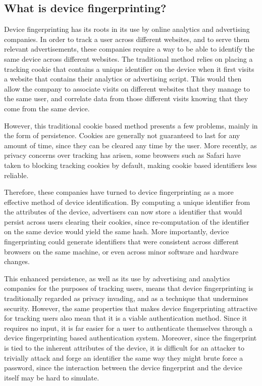 \documentclass{acm_proc_article-sp}
\begin{document}
\subsection{What is device fingerprinting?}
Device fingerprinting has its roots in its use by online analytics and advertising companies. In order to track a user across different websites, and to serve them relevant advertisements, these companies require a way to be able to identify the same device across different websites. The traditional method relies on placing a tracking cookie that contains a unique identifier on the device when it first visits a website that contains their analytics or advertising script. This would then allow the company to associate visits on different websites that they manage to the same user, and correlate data from those different visits knowing that they come from the same device.

However, this traditional cookie based method presents a few problems, mainly in the form of persistence. Cookies are generally not guaranteed to last for any amount of time, since they can be cleared any time by the user. More recently, as privacy concerns over tracking has arisen, some browsers such as Safari have taken to blocking tracking cookies by default, making cookie based identifiers less reliable.

Therefore, these companies have turned to device fingerprinting as a more effective method of device identification. By computing a unique identifier from the attributes of the device, advertisers can now store a identifier that would persist across users clearing their cookies, since re-computation of the identifier on the same device would yield the same hash. More importantly, device fingerprinting could generate identifiers that were consistent across different browsers on the same machine, or even across minor software and hardware changes.

This enhanced persistence, as well as its use by advertising and analytics companies for the purposes of tracking users, means that device fingerprinting is traditionally regarded as privacy invading, and as a technique that undermines security. However, the same properties that makes device fingerprinting attractive for tracking users also mean that it is a viable authentication method. Since it requires no input, it is far easier for a user to authenticate themselves through a device fingerprinting based authentication system. Moreover, since the fingerprint is tied to the inherent attributes of the device, it is difficult for an attacker to trivially attack and forge an identifier the same way they might brute force a password, since the interaction between the device fingerprint and the device itself may be hard to simulate. 
\end{document}
